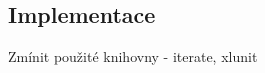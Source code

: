 \subsection{Implementace}



\begin{framed}
  Zmínit použité knihovny - iterate, xlunit
\end{framed}








